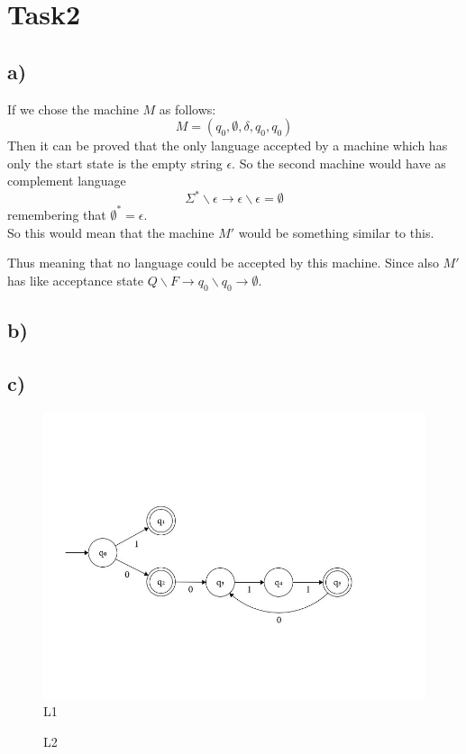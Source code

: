\chapter{Task2}
\section{a)}
If we chose the machine $M$ as follows: $$M = (q_0, \emptyset, \delta, q_0, {q_0})$$
Then it can be proved that the only language accepted by a machine which has only the start state is the empty string $\epsilon$. 
So the second machine would have as complement language $$\Sigma^* \backslash \epsilon \rightarrow \epsilon \backslash \epsilon = \emptyset$$ remembering that $\emptyset^* = \epsilon$.\\
 So this would mean that the machine $M'$ would be something similar to this. 
\begin{center}
\end{center}
Thus meaning that no language could be accepted by this machine. Since also $M'$ has like acceptance state $Q \backslash F \rightarrow q_0 \backslash q_0 \rightarrow \emptyset$. 
\section{b)}
\newpage
\section{c)}
	\begin{figure}[hbt]
	\label{L1}
  \includegraphics[width=\textwidth]{Immagini/l1.jpeg}
  \caption{L1}
\end{figure}



\begin{figure}[hbt]
	\label{L2}
  \caption{L2}
\end{figure}

